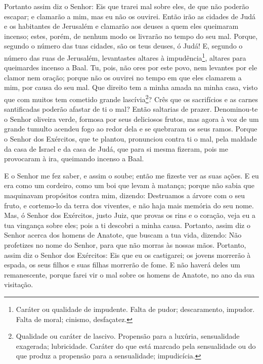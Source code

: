 Portanto assim diz o Senhor: Eis que trarei mal sobre eles, de
que não poderão escapar; e clamarão a mim, mas eu não os ouvirei.
Então irão as cidades de Judá e os habitantes de Jerusalém e
clamarão aos deuses a quem eles queimaram incenso; estes, porém, de
nenhum modo os livrarão no tempo do seu mal. Porque, segundo
o número das tuas cidades, são os teus deuses, ó Judá! E, segundo o
número das ruas de Jerusalém, levantastes altares à
impudência\footnote{Caráter ou qualidade de impudente. Falta de
pudor; descaramento, impudor. Falta de moral; cinismo, desfaçatez.},
altares para queimardes incenso a Baal. Tu, pois, não ores
por este povo, nem levantes por ele clamor nem oração; porque não os
ouvirei no tempo em que eles clamarem a mim, por causa do seu mal.
Que direito tem a minha amada na minha casa, visto que com
muitos tem cometido grande lascívia\footnote{Qualidade ou caráter de
lascivo. Propensão para a luxúria, sensualidade exagerada;
lubricidade. Caráter do que está marcado pela sensualidade ou do que
produz a propensão para a sensualidade; impudicícia.}? Crês que os
sacrifícios e as carnes santificadas poderão afastar de ti o mal?
Então saltarias de prazer. Denominou-te o Senhor oliveira
verde, formosa por seus deliciosos frutos, mas agora à voz de um
grande tumulto acendeu fogo ao redor dela e se quebraram os seus
ramos. Porque o Senhor dos Exércitos, que te plantou,
pronunciou contra ti o mal, pela maldade da casa de Israel e da casa
de Judá, que para si mesma fizeram, pois me provocaram à ira,
queimando incenso a Baal.

E o Senhor me fez saber, e assim o soube; então me fizeste ver as
suas ações. E eu era como um cordeiro, como um boi que levam
à matança; porque não sabia que maquinavam propósitos contra mim,
dizendo: Destruamos a árvore com o seu fruto, e cortemo-lo da terra
dos viventes, e não haja mais memória do seu nome. Mas, ó
Senhor dos Exércitos, justo Juiz, que provas os rins e o coração,
veja eu a tua vingança sobre eles; pois a ti descobri a minha causa.
Portanto, assim diz o Senhor acerca dos homens de Anatote,
que buscam a tua vida, dizendo: Não profetizes no nome do Senhor,
para que não morras às nossas mãos. Portanto, assim diz o
Senhor dos Exércitos: Eis que eu os castigarei; os jovens morrerão à
espada, os seus filhos e suas filhas morrerão de fome. E não
haverá deles um remanescente, porque farei vir o mal sobre os homens
de Anatote, no ano da sua visitação.

\medskip

